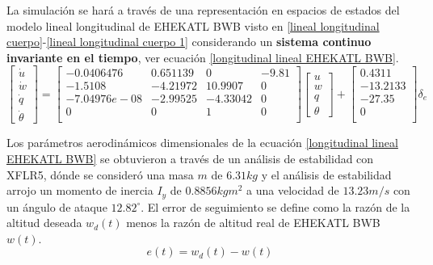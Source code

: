 La simulación se hará a través de una representación en espacios de estados del modelo lineal longitudinal de EHEKATL BWB visto en \ref{lineal longitudinal cuerpo}-\ref{lineal longitudinal cuerpo 1} considerando un \textbf{sistema continuo invariante en el tiempo}, ver ecuación \ref{longitudinal lineal EHEKATL BWB}.
\begin{equation}
\label{longitudinal lineal EHEKATL BWB}
    \begin{bmatrix}
        \dot u \\
        \dot w \\
        \dot q \\
        \dot \theta
    \end{bmatrix}
    =
    \begin{bmatrix}
    -0.0406476 & 0.651139 & 0 & -9.81 \\
    -1.5108 & -4.21972 & 10.9907 & 0 \\
    -7.04976e-08 & -2.99525 & -4.33042 & 0 \\
    0 & 0 & 1 & 0 \\
    \end{bmatrix}
    \begin{bmatrix}
        u \\
        w \\
        q \\
        \theta
    \end{bmatrix}
    +
    \begin{bmatrix}
    0.4311 \\
    -13.2133 \\
    -27.35 \\
    0\\
    \end{bmatrix}
    \delta_e
\end{equation}

Los parámetros aerodinámicos dimensionales de la ecuación \ref{longitudinal lineal EHEKATL BWB} se obtuvieron a través de un análisis de estabilidad con XFLR5, dónde se consideró una masa $m$ de $6.31kg$ y el análisis de estabilidad arrojo un momento de inercia $I_y$ de $0.8856 kgm^2$ a una velocidad de $13.23m/s$ con un ángulo de ataque $12.82^{\circ}$. 
El error de seguimiento se define como la razón de la altitud deseada $w_d (t)$ menos la razón de altitud real de EHEKATL BWB $ w(t)$. 
\begin{equation}
    e (t) = w_d (t) - w(t)
\end{equation}

